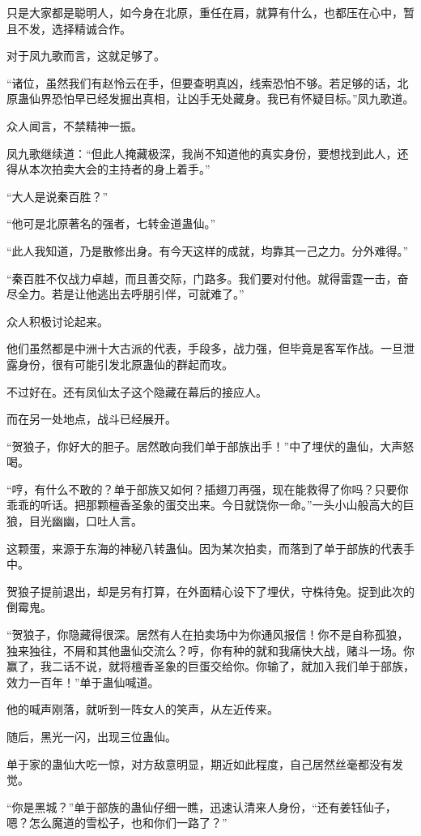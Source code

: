 \begin{this_body}
只是大家都是聪明人，如今身在北原，重任在肩，就算有什么，也都压在心中，暂且不发，选择精诚合作。

对于凤九歌而言，这就足够了。

“诸位，虽然我们有赵怜云在手，但要查明真凶，线索恐怕不够。若足够的话，北原蛊仙界恐怕早已经发掘出真相，让凶手无处藏身。我已有怀疑目标。”凤九歌道。

众人闻言，不禁精神一振。

凤九歌继续道：“但此人掩藏极深，我尚不知道他的真实身份，要想找到此人，还得从本次拍卖大会的主持者的身上着手。”

“大人是说秦百胜？”

“他可是北原著名的强者，七转金道蛊仙。”

“此人我知道，乃是散修出身。有今天这样的成就，均靠其一己之力。分外难得。”

“秦百胜不仅战力卓越，而且善交际，门路多。我们要对付他。就得雷霆一击，奋尽全力。若是让他逃出去呼朋引伴，可就难了。”

众人积极讨论起来。

他们虽然都是中洲十大古派的代表，手段多，战力强，但毕竟是客军作战。一旦泄露身份，很有可能引发北原蛊仙的群起而攻。

不过好在。还有凤仙太子这个隐藏在幕后的接应人。

而在另一处地点，战斗已经展开。

“贺狼子，你好大的胆子。居然敢向我们单于部族出手！”中了埋伏的蛊仙，大声怒喝。

“哼，有什么不敢的？单于部族又如何？插翅刀再强，现在能救得了你吗？只要你乖乖的听话。把那颗檀香圣象的蛋交出来。今日就饶你一命。”一头小山般高大的巨狼，目光幽幽，口吐人言。

这颗蛋，来源于东海的神秘八转蛊仙。因为某次拍卖，而落到了单于部族的代表手中。

贺狼子提前退出，却是另有打算，在外面精心设下了埋伏，守株待兔。捉到此次的倒霉鬼。

“贺狼子，你隐藏得很深。居然有人在拍卖场中为你通风报信！你不是自称孤狼，独来独往，不屑和其他蛊仙交流么？哼，你有种的就和我痛快大战，赌斗一场。你赢了，我二话不说，就将檀香圣象的巨蛋交给你。你输了，就加入我们单于部族，效力一百年！”单于蛊仙喊道。

他的喊声刚落，就听到一阵女人的笑声，从左近传来。

随后，黑光一闪，出现三位蛊仙。

单于家的蛊仙大吃一惊，对方敌意明显，期近如此程度，自己居然丝毫都没有发觉。

“你是黑城？”单于部族的蛊仙仔细一瞧，迅速认清来人身份，“还有姜钰仙子，嗯？怎么魔道的雪松子，也和你们一路了？”


\end{this_body}
